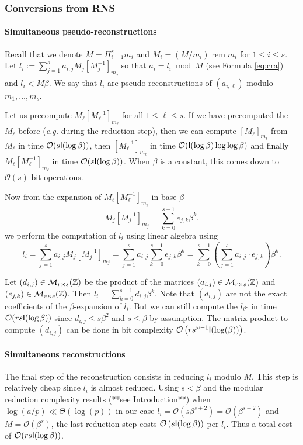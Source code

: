 \documentclass[acmtoms,acmnow]{acmtrans2m}
\def\Mat{\mathcal{M}}
\def\bigO{{\ensuremath{\mathcal{O}}}}
\newcommand{\tmop}[1]{\ensuremath{\operatorname{#1}}}
\newcommand{\assign}{:=}
\newcommand{\rem}{\tmop{rem}}
\begin{document}
\subsubsection{Conversions from RNS}

\paragraph*{Simultaneous pseudo-reconstructions}

Recall that we denote $M=\Pi_{i=1}^sm_i$ and $M_i=(M/m_i) \rem m_i$ for
$1 \leqslant i \leqslant s$.  Let
$l_i \assign \sum_{j = 1}^s a_{i, j} M_j [M_j^{- 1}]_{m_j}$ so that
$a_i = l_i \bmod M$ (see Formula \eqref{eq:cra}) and $l_i < M \beta$. We say
that $l_i$ are pseudo-reconstructions of $(a_{i, \ell})$ modulo
$m_1, \ldots, m_s$.

Let us precompute $M_{\ell} [M_{\ell}^{- 1}]_{m_{\ell}}$ for all
$1 \leqslant \ell \leqslant s$. If we have precomputed the $M_\ell$ before
(\emph{e.g.} during the reduction step), then we can compute
$[M_{\ell}]_{m_{\ell}}$ from $M_\ell$ in time $\bigO(s \I(\log \beta))$, then
$[M_{\ell}^{-1}]_{m_{\ell}}$ in time $\bigO(\I(\log \beta) \log \log \beta)$ and
finally $M_{\ell} [M_{\ell}^{- 1}]_{m_{\ell}}$ in time
$\bigO(s \I(\log \beta))$. When $\beta$ is a constant, this comes down to
$\bigO(s)$ bit operations.


Now from the expansion of $M_{\ell} [M_{\ell}^{- 1}]_{m_{\ell}}$
in base $\beta$
\[
M_j [M_j^{- 1}]_{m_j} = \sum_{k = 0}^{s - 1} e_{j, k} \beta^k.
\]
we perform the computation of $l_i$ using linear algebra using
\[ 
l_i = \sum_{j = 1}^s a_{i, j} M_j [M_j^{- 1}]_{m_j} = \sum_{j = 1}^s
a_{i, j} \sum_{k = 0}^{s - 1} e_{j, k} \beta^k = \sum_{k = 0}^{s - 1} \left(
  \sum_{j = 1}^s a_{i, j} \cdot e_{j, k} \right) \beta^k . 
\]

Let $(d_{i, j}) \in \Mat_{r \times s}(\Z)$ be the product of the matrices
$(a_{i, j}) \in \Mat_{r \times s}(\Z)$ and
$(e_{j, k}) \in \Mat_{s \times s}(\Z)$. Then
$l_i = \sum_{k = 0}^{s - 1} d_{i, j} \beta^k$.
Note that $(d_{i, j})$ are not the exact coefficients of the $\beta$-expansion
of $l_i$.
But we can still compute the $l_i$s in time $\bigO(r s \I(\log \beta))$
since $d_{i, j} \leqslant s \beta^2$ and $s \leqslant \beta$ by assumption.
The matrix product to compute $(d_{i, j})$ can be done in bit complexity
$\bigO \left( rs^{\omega - 1} \I (\log (\beta)) \right)$.

\paragraph{Simultaneous reconstructions}The final step of the reconstruction
consists in reducing $l_i$ modulo $M$. This step is relatively cheap since $l_i$
is almost reduced.  Using $s < \beta$ and the modular reduction complexity
results (**see Introduction**) when $\log (a / p) \ll \Theta (\log (p))$ in our
case $l_i =\bigO (s \beta^{s + 2}) = \bigO(\beta^{s + 2})$ and
$M =\bigO (\beta^s)$, the last reduction step costs
$\bigO \left( s \I (\log \beta) \right)$ per $l_i$. Thus a total cost of
$\bigO (r s \I (\log \beta))$.
\end{document}
